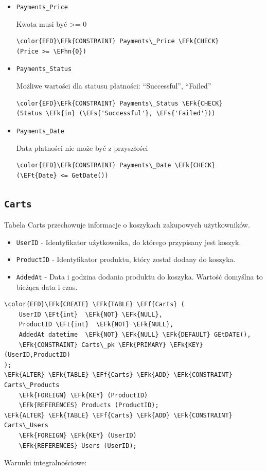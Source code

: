 \documentclass[11pt]{article}
\newcommand{\EFs}[1]{\textcolor{EFs}{#1}} %
\newcommand{\EFk}[1]{\textcolor{EFk}{\textbf{#1}}} %
\newcommand{\EFf}[1]{\textcolor{EFf}{#1}} %
\newcommand{\EFt}[1]{\textcolor{EFt}{\textbf{#1}}} %
\newcommand{\EFhn}[1]{\textcolor{EFhn}{#1}} %
\begin{document}
\begin{itemize}
\item \texttt{Payments\_Price}

Kwota musi być  >= 0
\begin{Code}
\begin{Verbatim}
\color{EFD}\EFk{CONSTRAINT} Payments\_Price \EFk{CHECK}
(Price >= \EFhn{0})
\end{Verbatim}
\end{Code}
\item \texttt{Payments\_Status}

Możliwe wartości dla statusu płatności: ``Successful'', ``Failed''
\begin{Code}
\begin{Verbatim}
\color{EFD}\EFk{CONSTRAINT} Payments\_Status \EFk{CHECK}
(Status \EFk{in} (\EFs{'Successful'}, \EFs{'Failed'}))
\end{Verbatim}
\end{Code}
\item \texttt{Payments\_Date}

Data płatności nie może być z przyszłości
\begin{Code}
\begin{Verbatim}
\color{EFD}\EFk{CONSTRAINT} Payments\_Date \EFk{CHECK}
(\EFt{Date} <= GetDate())
\end{Verbatim}
\end{Code}
\end{itemize}
\subsection{\texttt{Carts}}
\label{sec:org430c4bb}
Tabela Carts przechowuje informacje o koszykach zakupowych użytkowników.
\begin{itemize}
\item \texttt{UserID} - Identyfikator użytkownika, do którego przypisany jest koszyk.
\item \texttt{ProductID} - Identyfikator produktu, który został dodany do koszyka.
\item \texttt{AddedAt} - Data i godzina dodania produktu do koszyka. Wartość domyślna to bieżąca data i czas.
\end{itemize}
\begin{Code}
\begin{Verbatim}
\color{EFD}\EFk{CREATE} \EFk{TABLE} \EFf{Carts} (
    UserID \EFt{int}  \EFk{NOT} \EFk{NULL},
    ProductID \EFt{int}  \EFk{NOT} \EFk{NULL},
    AddedAt datetime  \EFk{NOT} \EFk{NULL} \EFk{DEFAULT} GEtDATE(),
    \EFk{CONSTRAINT} Carts\_pk \EFk{PRIMARY} \EFk{KEY}  (UserID,ProductID)
);
\EFk{ALTER} \EFk{TABLE} \EFf{Carts} \EFk{ADD} \EFk{CONSTRAINT} Carts\_Products
    \EFk{FOREIGN} \EFk{KEY} (ProductID)
    \EFk{REFERENCES} Products (ProductID);
\EFk{ALTER} \EFk{TABLE} \EFf{Carts} \EFk{ADD} \EFk{CONSTRAINT} Carts\_Users
    \EFk{FOREIGN} \EFk{KEY} (UserID)
    \EFk{REFERENCES} Users (UserID);
\end{Verbatim}
\end{Code}
Warunki integralnościowe:
\end{document}
